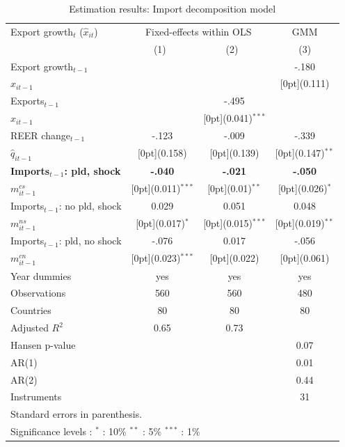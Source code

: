 \documentclass[10pt,letterpaper,pdftex]{article}
\begin{document}
\begin{table}[!htb]\centering
 \caption{Estimation results: Import decomposition model
\label{tab:ImportDecompModel}}
\begin{tabular*}{0.8\textwidth}{@{\extracolsep{\fill}}lccc}		
Export growth$_t$ ($\hat{x}_{it}$)	& \multicolumn{2}{c}{Fixed-effects within OLS} &	\multicolumn{1}{c}{GMM} \\
\cline{2-4}			
	& \multicolumn{1}{c}{(1)\mbox{\ }} &	\multicolumn{1}{c}{(2)\mbox{\ }} &	\multicolumn{1}{c}{(3)} \\
\hline			
Export growth$_{t-1}$ &	&	 &	-.180\\
\quad $\hat{x}_{it-1}$ &	&	 &	\raisebox{.7ex}[0pt]{\scriptsize (0.111)}\\
Exports$_{t-1}$ &	&	-.495 &	 \\
\quad $x_{it-1}$ &	&	\raisebox{.7ex}[0pt]{\scriptsize (0.041)$^{***}$} & 	 \\
REER change$_{t-1}$ &	-.123 &	-.009 &	-.339 \\
\quad $\hat{q}_{it-1}$ &	\raisebox{.7ex}[0pt]{\scriptsize (0.158)} &	\raisebox{.7ex}[0pt]{\scriptsize (0.139)} &	\raisebox{.7ex}[0pt]{\scriptsize (0.147)$^{**}$} \\
\textbf{Imports$_{t-1}$: pld, shock} &	\textbf{-.040} &	\textbf{-.021} &	\textbf{-.050} \\
\quad $m^{cs}_{it-1}$ &	\raisebox{.7ex}[0pt]{\scriptsize (0.011)$^{***}$} &	\raisebox{.7ex}[0pt]{\scriptsize (0.01)$^{**}$} &	\raisebox{.7ex}[0pt]{\scriptsize (0.026)$^{*}$} \\
Imports$_{t-1}$: no pld, shock &	0.029 &	0.051 &	0.048 \\
\quad $m^{ns}_{it-1}$ &	\raisebox{.7ex}[0pt]{\scriptsize (0.017)$^{*}$} &	\raisebox{.7ex}[0pt]{\scriptsize (0.015)$^{***}$} &	\raisebox{.7ex}[0pt]{\scriptsize (0.019)$^{**}$} \\
Imports$_{t-1}$: pld, no shock &	-.076 &	0.017 &	-.056 \\
\quad $m^{cn}_{it-1}$ &	\raisebox{.7ex}[0pt]{\scriptsize (0.023)$^{***}$} &	\raisebox{.7ex}[0pt]{\scriptsize (0.022)} &	\raisebox{.7ex}[0pt]{\scriptsize (0.061)} \\
Year dummies &	yes &	yes &	yes \\
\hline
Observations &	560 &	560 &	480 	\\
Countries & 80 & 80 & 80 \\
Adjusted $R^2$ &	0.65  &	0.73 &	\\
Hansen p-value & & & 0.07 \\
AR(1) & & & 0.01 \\
AR(2) & & & 0.44\\
Instruments & & & 31 \\
\hline\hline					
\multicolumn{4}{l}{\footnotesize{Standard errors in parenthesis.}}\\
\multicolumn{4}{l}{\footnotesize{Significance levels
:\hspace{1em} $^{*}$ : 10\% \hspace{1em}
$^{**}$ : 5\% \hspace{1em} $^{***}$ : 1\% \normalsize}}
\end{tabular*}
\end{table}			
\end{document}
